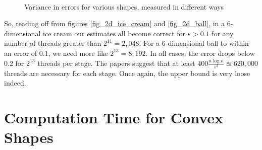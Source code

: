 \begin{figure}
\centering
{}
\\

\caption{Variance in errors for various shapes, measured in different ways}
\label{fig_histograms}
\end{figure}


So, reading off from figures \ref{fig_2d_ice_cream} and \ref{fig_2d_ball}, in a 6-dimensional ice cream our estimates all become correct for $\varepsilon > 0.1$ for any number of threads greater than $2^11 = 2,048$. For a 6-dimensional ball to within an error of $0.1$, we need more like $2^{13} = 8,192$. In all cases, the error drops below $0.2$ for $2^{13}$ threads per stage. The papers suggest that at least $400\frac{n\log n}{\varepsilon^2} \approxeq 620,000$ threads are necessary for each stage. Once again, the upper bound is very loose indeed.

\section{Computation Time for Convex Shapes}\label{sec_time}

